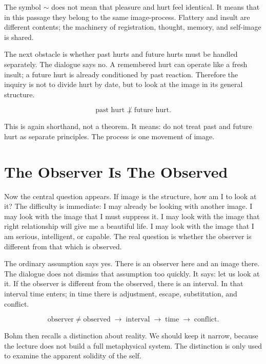 The symbol \(\sim\) does not mean that pleasure and hurt feel identical. It means that in this passage they belong to the same image-process. Flattery and insult are different contents; the machinery of registration, thought, memory, and self-image is shared.

The next obstacle is whether past hurts and future hurts must be handled separately. The dialogue says no. A remembered hurt can operate like a fresh insult; a future hurt is already conditioned by past reaction. Therefore the inquiry is not to divide hurt by date, but to look at the image in its general structure.

\begin{equation}
\text{past hurt}
\not\perp
\text{future hurt}.
\end{equation}

This is again shorthand, not a theorem. It means: do not treat past and future hurt as separate principles. The process is one movement of image.

\section{The Observer Is The Observed}

Now the central question appears. If image is the structure, how am I to look at it? The difficulty is immediate: I may already be looking with another image. I may look with the image that I must suppress it. I may look with the image that right relationship will give me a beautiful life. I may look with the image that I am serious, intelligent, or capable. The real question is whether the observer is different from that which is observed.

The ordinary assumption says yes. There is an observer here and an image there. The dialogue does not dismiss that assumption too quickly. It says: let us look at it. If the observer is different from the observed, there is an interval. In that interval time enters; in time there is adjustment, escape, substitution, and conflict.

\begin{equation}
\text{observer} \neq \text{observed}
\;\longrightarrow\;
\text{interval}
\;\longrightarrow\;
\text{time}
\;\longrightarrow\;
\text{conflict}.
\end{equation}

Bohm then recalls a distinction about reality. We should keep it narrow, because the lecture does not build a full metaphysical system. The distinction is only used to examine the apparent solidity of the self.

